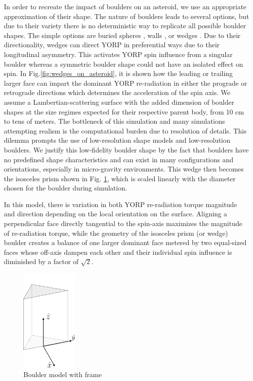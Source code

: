 In order to recreate the impact of boulders on an asteroid, we use an appropriate approximation of their shape. The nature of boulders leads to several options, but due to their variety there is no deterministic way to replicate all possible boulder shapes. The simple options are buried spheres \cite{Golubov2014}, walls \cite{Golubov2017}, or wedges \cite{Bottke2006}. Due to their directionality, wedges can direct YORP in preferential ways due to their longitudinal asymmetry. This activates YORP spin influence from a singular boulder whereas a symmetric boulder shape could not have an isolated effect on spin. In Fig.\ref{fig:wedges_on_asteroid}, it is shown how the leading or trailing larger face can impart the dominant YORP re-radiation in either the prograde or retrograde directions which determines the acceleration of the spin axis. 
We assume a Lambertian-scattering surface with the added dimension of boulder shapes at the size regimes expected for their respective parent body, from 10 cm to tens of meters. The bottleneck of this simulation and many simulations attempting realism is the computational burden due to resolution of details. This dilemma prompts the use of low-resolution shape models and low-resolution boulders. We justify this low-fidelity boulder shape by the fact that boulders have no predefined shape characteristics and can exist in many configurations and orientations, especially in micro-gravity environments. This wedge then becomes the isosceles prism shown in Fig. \ref{fig:prism}, which is scaled linearly with the diameter chosen for the boulder during simulation.


In this model, there is variation in both YORP re-radiation torque magnitude and direction depending on the local orientation on the surface. Aligning a perpendicular face directly tangential to the spin-axis maximizes the magnitude of re-radiation torque, while the geometry of the isosceles prism (or wedge) boulder creates a balance of one larger dominant face metered by two equal-sized faces whose off-axis dampen each other and their individual spin influence is diminished by a factor of $\sqrt{2}$.

\begin{figure}[H]
    \centering
    \includegraphics[width=0.25\textwidth,height=0.4\textwidth]{fig/prism.png}
    \caption{Boulder model with frame}
    \label{fig:prism}
\end{figure}


